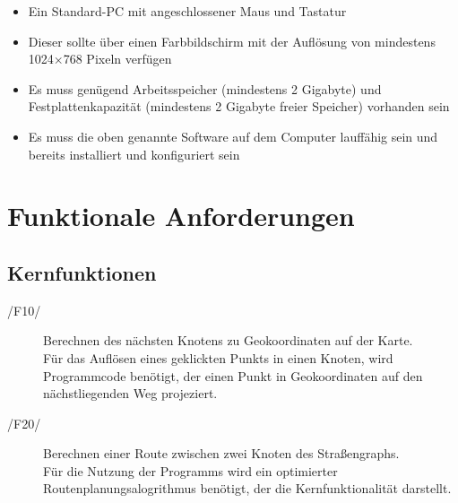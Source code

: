 \documentclass[a4paper, 11pt]{article}
\makeatletter
\def\namedlabel#1#2{\begingroup
    #2%
    \def\@currentlabel{#2}%
    \phantomsection\label{#1}\endgroup
}
\newcommand{\oitem}[1]{\item[\namedlabel{#1}{/#1/}]}
\makeatother
\begin{document}
\begin{itemize}
\item Ein Standard-PC mit angeschlossener Maus und Tastatur
\item Dieser sollte über einen Farbbildschirm mit der Auflösung von mindestens 1024$\times$768 Pixeln verfügen
\item Es muss genügend Arbeitsspeicher (mindestens 2 Gigabyte) und Festplattenkapazität (mindestens 2 Gigabyte freier Speicher) vorhanden sein
\item Es muss die oben genannte Software auf dem Computer lauffähig sein und bereits installiert und konfiguriert sein
\end{itemize}

\section{Funktionale Anforderungen}
\subsection{Kernfunktionen}
\begin{description}
\oitem{F10}
Berechnen des nächsten Knotens zu Geokoordinaten auf der Karte.\\
Für das Auflösen eines geklickten Punkts in einen Knoten, wird Programmcode benötigt, der einen Punkt in Geokoordinaten auf den nächstliegenden Weg projeziert.
\oitem{F20}
Berechnen einer Route zwischen zwei Knoten des Straßengraphs.\\
Für die Nutzung der Programms wird ein optimierter Routenplanungsalogrithmus benötigt, der die Kernfunktionalität darstellt.
\end{description}
\end{document}
